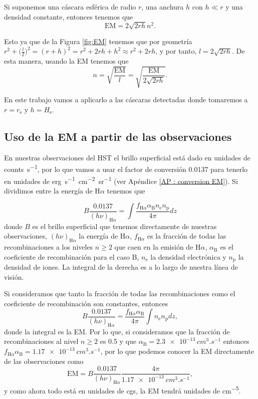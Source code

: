\documentclass{book}
\begin{document}
Si suponemos una cáscara esférica de radio $r$, una anchura $h$ con  $h\ll r$ y una densidad constante, entonces tenemos que
\begin{equation}
\mathrm{EM}=2\sqrt{2rh}n^2.\end{equation}

Esto ya que de la Figura \ref{fig:EM} tenemos que por geometría $r^2+\Big(\frac{l}{2}\Big)^2=(r+h)^2=r^2+2rh+h^2\approx r^2+2rh$, y por tanto, $ l=2\sqrt{2rh}$. De esta manera, usando la EM tenemos que \begin{equation}n=\sqrt{\frac{\mathrm{EM}}{l}}=\sqrt{\frac{\mathrm{EM}}{2\sqrt{2rh}}}.
\end{equation} 

En este trabajo vamos a aplicarlo a las cáscaras detectadas donde tomaremos a $r=r_\mathrm{s}$ y $h=H_\mathrm{s}$.

\subsection{Uso de la EM a partir de las observaciones} \label{Subsec : EM}

En nuestras observaciones del HST el brillo superficial está dado en unidades de \unit{counts.s^{-1}}, por lo que vamos a usar el factor de conversión 0.0137 para tenerlo en unidades de \unit{erg.s^{-1}.cm^{-2}.sr^{-1}} (ver Apéndice \ref{AP : conversion EM}). Si dividimos entre la energía de H$\alpha$ tenemos que

\begin{equation}
    B\frac{0.0137}{(h\nu)_{\mathrm{H}\alpha}}=\int \frac{f_{\mathrm{H}\alpha}\alpha_\mathrm{B} n_\mathrm{e} n_\mathrm{p}}{4\pi} dz
\end{equation}
donde $B$ es el brillo superficial que tenemos directamente de nuestras observaciones, $(h\nu)_{\mathrm{H}\alpha}$ la energía de H$\alpha$, $f_{\mathrm{H}\alpha}$ es la fracción de todas las recombinaciones a los niveles $n\geq 2$ que caen en la emisión de H$\alpha$, $\alpha_\mathrm{B}$ es el coeficiente de recombinación para el caso B, $n_\mathrm{e}$ la densidad electrónica y $n_\mathrm{p}$ la densidad de iones. La integral de la derecha es a lo largo de nuestra línea de visión.

Si consideramos que tanto la fracción de todas las recombinaciones como el coeficiente de recombinación son constantes, entonces
\begin{equation}
    B\frac{0.0137}{(h\nu)_{\mathrm{H}\alpha}}=\frac{f_{\mathrm{H}\alpha}\alpha_\mathrm{B}}{4\pi}\int n_\mathrm{e} n_\mathrm{p} dz,
\end{equation}
donde la integral es la EM. Por lo que, si consideramos que la fracción de recombinaciones al nivel $n\geq 2$ es 0.5 y que $\alpha_\mathrm{B}=\SI{2.3e-13}{cm^{3}.s^{-1}}$ entonces  $f_{\mathrm{H}\alpha}\alpha_\mathrm{B}=\SI{1.17e-13}{cm^3.s^{-1}}$, por lo que podemos conocer la EM directamente de las observaciones como
\begin{equation}
    \mathrm{EM} = B\frac{0.0137}{(h\nu)_{\mathrm{H}\alpha}}\frac{4\pi}{\SI{1.17e-13}{cm^3.s^{-1}}},
\end{equation}
y como ahora todo está en unidades de cgs, la EM tendrá unidades de \unit{cm^{-5}}.\\
\end{document}

